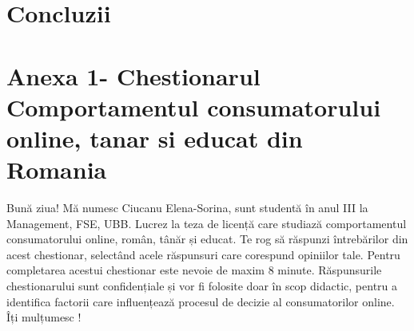 \documentclass[a4paper, 12pt]{article}
\begin{document}
	

	
	\newpage 
	\section{Concluzii}
	\newpage
	
	
\newpage 


\newpage 
\section{Anexa 1- Chestionarul Comportamentul consumatorului online, tanar si educat din Romania }	
	\quad Bună ziua! Mă numesc Ciucanu Elena-Sorina, sunt studentă în anul III la Management, FSE, UBB. Lucrez la teza de licență care studiază comportamentul consumatorului online, român, tânăr și educat. Te rog să răspunzi întrebărilor din acest chestionar, selectând acele răspunsuri care corespund opiniilor tale. Pentru completarea acestui chestionar este nevoie de maxim 8 minute. Răspunsurile chestionarului sunt confidențiale și vor fi folosite doar în scop didactic, pentru a identifica factorii care influențează procesul de decizie al consumatorilor online. Îți mulțumesc !
\newline
\end{document}
